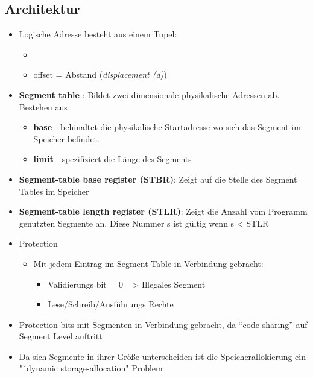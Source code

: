 \documentclass[a4paper]{scrreprt}
\begin{document}
\subsection{Architektur}
\begin{itemize}
\item Logische Adresse besteht aus einem Tupel:
\begin{itemize}
\item <segment-nummer, offset>
\item offset = Abstand (\textit{displacement (d)})
\end{itemize}

\item \textbf{Segment table} : Bildet zwei-dimensionale physikalische Adressen ab. Bestehen aus
\begin{itemize}
\item \textbf{base} - behinaltet die physikalische Startadresse wo sich das Segment im Speicher befindet.
\item \textbf{limit} - spezifiziert die Länge des Segments
\end{itemize}

\item \textbf{Segment-table base register (STBR)}: Zeigt auf die Stelle des Segment Tables im Speicher

\item \textbf{Segment-table length register (STLR)}: Zeigt die Anzahl vom Programm genutzten Segmente an. Diese Nummer s ist gültig wenn s < STLR

\item Protection
\begin{itemize}
\item Mit jedem Eintrag im Segment Table in Verbindung gebracht:
\begin{itemize}
\item Validierungs bit = 0 => Illegales Segment
\item Lese/Schreib/Ausführungs Rechte
\end{itemize}
\end{itemize}

 \item Protection bits mit Segmenten in Verbindung gebracht, da "`code sharing"' auf Segment Level auftritt
 
 \item Da sich Segmente in ihrer Größe unterscheiden ist die Speicherallokierung ein "`dynamic storage-allocation" Problem
 

\end{itemize}
\end{document}
